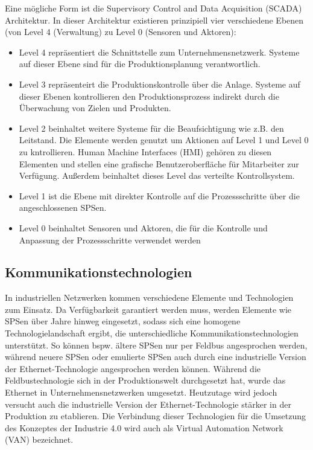 Eine mögliche Form ist die Supervisory Control and Data Acquisition (SCADA) Architektur. In dieser Architektur existieren prinzipiell vier verschiedene Ebenen (von Level 4 (Verwaltung) zu Level 0 (Sensoren und Aktoren):
\begin{itemize}
\item Level 4 repräsentiert die Schnittstelle zum Unternehmensnetzwerk. Systeme auf dieser Ebene sind für die Produktionsplanung verantwortlich.
\item Level 3 repräsenteirt die Produktionskontrolle über die Anlage. Systeme auf dieser Ebenen kontrollieren den Produktionsprozess indirekt durch die Überwachung von Zielen und Produkten.
\item Level 2 beinhaltet weitere Systeme für die Beaufsichtigung wie z.B. den Leitstand. Die Elemente werden genutzt um Aktionen auf Level 1 und Level 0 zu kntrollieren. Human Machine Interfaces (HMI) gehören zu diesen Elementen und stellen eine grafische Benutzeroberfläche für Mitarbeiter zur Verfügung. Außerdem beinhaltet dieses Level das verteilte Kontrollsystem.
\item Level 1 ist die Ebene mit direkter Kontrolle auf die Prozessschritte über die angeschlossenen SPSen.
\item Level 0 beinhaltet Sensoren und Aktoren, die für die Kontrolle und Anpassung der Prozessschritte verwendet werden
\end{itemize}

\subsection{Kommunikationstechnologien}
In industriellen Netzwerken kommen verschiedene Elemente und Technologien zum Einsatz. Da Verfügbarkeit garantiert werden muss, werden Elemente wie SPSen über Jahre hinweg eingesetzt, sodass sich eine homogene Technologielandschaft ergibt, die unterschiedliche Kommunikationstechnologien unterstützt. So können bspw. ältere SPSen nur per Feldbus angesprochen werden, während neuere SPSen oder emulierte SPSen auch durch eine industrielle Version der Ethernet-Technologie angesprochen werden können. Während die Feldbustechnologie sich in der Produktionswelt durchgesetzt hat, wurde das Ethernet in Unternehmensnetzwerken umgesetzt. Heutzutage wird jedoch versucht auch die industrielle Version der Ethernet-Technologie stärker in der Produktion zu etablieren. Die Verbindung dieser Technologien für die Umsetzung des Konzeptes der Industrie 4.0 wird auch als Virtual Automation Network (VAN) bezeichnet.

